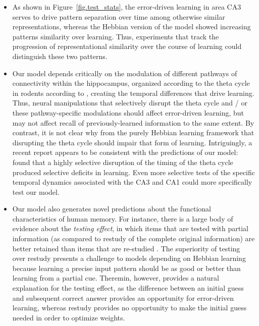 \documentclass[11pt,twoside]{article}
\newif\myifpdf
\begin{document}
\begin{itemize}
    \item As shown in Figure~\ref{fig.test_stats}, the error-driven learning in area CA3 serves to drive pattern separation over time among otherwise similar representations, whereas the Hebbian version of the model showed increasing patterns similarity over learning.  Thus, experiments that track the progression of representational similarity over the course of learning could distinguish these two patterns.

    \item Our model depends critically on the modulation of different pathways of connectivity within the hippocampus, organized according to the theta cycle in rodents according to \citet{HasselmoBodelonWyble02}, creating the temporal differences that drive learning.  Thus, neural manipulations that selectively disrupt the theta cycle and / or these pathway-specific modulations should affect error-driven learning, but may not affect recall of previously-learned information to the same extent.  By contrast, it is not clear why from the purely Hebbian learning framework that disrupting the theta cycle should impair that form of learning.  Intriguingly, a recent report appears to be consistent with the predictions of our model: \citet{QuirkZutshiSrikanthEtAl21} found that a highly selective disruption of the timing of the theta cycle produced selective deficits in learning.  Even more selective tests of the specific temporal dynamics associated with the CA3 and CA1 could more specifically test our model. 

    \item Our model also generates novel predictions about the functional characteristics of human memory. For instance, there is a large body of evidence about the \emph{testing effect}, in which items that are tested with partial information (as compared to restudy of the complete original information) are better retained than items that are re-studied  \citep{LiuOReillyRanganath21}.  The superiority of testing over restudy presents a challenge to models depending on Hebbian learning because learning a precise input pattern should be as good or better than learning from a partial cue. Theremin, however, provides a natural explanation for the testing effect, as the difference between an initial guess and subsequent correct answer provides an opportunity for error-driven learning, whereas restudy provides no opportunity to make the initial guess needed in order to optimize weights.
    
\end{itemize}
\end{document}
